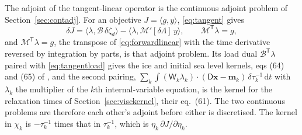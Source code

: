 \documentclass[11pt,a4paper]{article}
\newcommand{\dd}{\mathrm{d}}
\numberwithin{equation}{section}
\begin{document}
The adjoint of the tangent-linear operator is the continuous adjoint problem
of Section~\ref{sec:contadj}. For an objective $J = \langle g, y\rangle$,
\eqref{eq:tangent} gives
\begin{equation}
\delta J = \langle\lambda, \mathcal{B}\,\delta\zeta_{d}\rangle
 - \langle\lambda, \mathcal{M}'[\delta\Lambda]\,y\rangle,\qquad
\mathcal{M}^{\mathsf T}\lambda = g,
\label{eq:duality}
\end{equation}
and $\mathcal{M}^{\mathsf T}\lambda = g$, the transpose of
\eqref{eq:forwardlinear} with the time derivative reversed by integration by
parts, is that adjoint problem. Its load dual $\mathcal{B}^{\mathsf T}\lambda$
paired with \eqref{eq:tangentload} gives the ice and initial sea level
kernels, eqs (64) and (65) of \citet{YuEtAl2025}, and the second pairing,
$\sum_{k}\int(\mathsf{W}_{k}\lambda_{k})\cdot(\mathsf{D}\mathbf{x}-\mathbf{m}_{k})\,
\delta\tau_{k}^{-1}\,\dd t$ with $\lambda_{k}$ the multiplier of the $k$th
internal-variable equation, is the kernel for the relaxation times of
Section~\ref{sec:visckernel}, their eq.~(61). The two continuous problems are
therefore each other's adjoint before either is discretised. The kernel in
$\chi_{k}$ is $-\tau_{k}^{-1}$ times that in $\tau_{k}^{-1}$, which is
$\eta_{k}\,\partial J/\partial\eta_{k}$.
\end{document}
